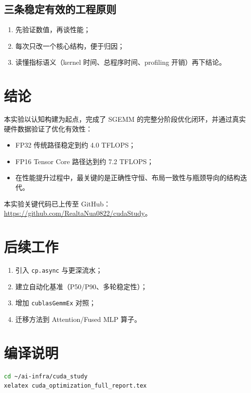 \documentclass[12pt,a4paper]{ctexart}
\begin{document}
\subsection{三条稳定有效的工程原则}
\begin{enumerate}[leftmargin=2em]
  \item 先验证数值，再谈性能；
  \item 每次只改一个核心结构，便于归因；
  \item 读懂指标语义（kernel 时间、总程序时间、profiling 开销）再下结论。
\end{enumerate}

\section{结论}
本实验以认知构建为起点，完成了 SGEMM 的完整分阶段优化闭环，并通过真实硬件数据验证了优化有效性：
\begin{itemize}[leftmargin=2em]
  \item FP32 传统路径稳定到约 4.0 TFLOPS；
  \item FP16 Tensor Core 路径达到约 7.2 TFLOPS；
  \item 在性能提升过程中，最关键的是正确性守恒、布局一致性与瓶颈导向的结构迭代。
\end{itemize}
本实验关键代码已上传至 GitHub：\url{https://github.com/RealtaNua0822/cudaStudy}。

\section{后续工作}
\begin{enumerate}[leftmargin=2em]
  \item 引入 \texttt{cp.async} 与更深流水；
  \item 建立自动化基准（P50/P90、多轮稳定性）；
  \item 增加 \texttt{cublasGemmEx} 对照；
  \item 迁移方法到 Attention/Fused MLP 算子。
\end{enumerate}

\appendix
\section{编译说明}
\begin{lstlisting}[language=bash]
cd ~/ai-infra/cuda_study
xelatex cuda_optimization_full_report.tex
\end{lstlisting}
\end{document}
